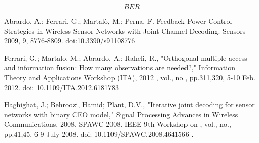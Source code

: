 \documentclass[a4paper,10pt]{article}
\begin{document}
\begin{equation}
 BER
\end{equation}

 
 \begin{thebibliography}{99}
Abrardo, A.; Ferrari, G.; Martalò, M.; Perna, F. Feedback Power Control Strategies in 
Wireless Sensor Networks with Joint Channel Decoding. Sensors 2009, 9, 8776-8809.
doi:10.3390/s91108776
 
Ferrari, G.; Martalo, M.; Abrardo, A.; Raheli, R., "Orthogonal multiple access 
and information fusion: How many observations are needed?," Information Theory and 
Applications Workshop (ITA), 2012 , vol., no., pp.311,320, 5-10 Feb. 2012.
doi: 10.1109/ITA.2012.6181783
 
Haghighat, J.; Behroozi, Hamid; Plant, D.V., "Iterative joint decoding for sensor 
networks with binary CEO model," Signal Processing Advances in Wireless 
Communications, 2008. SPAWC 2008. IEEE 9th Workshop on , vol., no., pp.41,45, 
6-9 July 2008. doi: 10.1109/SPAWC.2008.4641566 .

 \end{thebibliography} 
\end{document}

